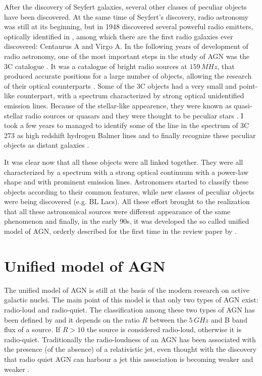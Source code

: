 \documentclass[../main.tex]{subfiles}
\begin{document}
After the discovery of Seyfert galaxies, several other classes of peculiar objects have been discovered. 
At the same time of Seyfert's discovery, radio astronomy was still at its beginning, but in 1948 \citet{Bolton48} discovered several powerful radio emitters, optically identified in \citet{Bolton49}, among which there are the first radio galaxies ever discovered: Centaurus A and Virgo A.
In the following years of development of radio astronomy, one of the most important steps in the study of AGN was the 3C catalogue \citep{Edge59}.
It was a catalogue of bright radio sources at $159\,\si{MHz}$, that produced accurate positions for a large number of objects, allowing the research of their optical counterparts \citep{Shields99}.
Some of the 3C objects had a very small and point-like counterpart, with a spectrum characterized by strong optical unidentified emission lines.
Because of the stellar-like appearence, they were known as quasi-stellar radio sources or quasars and they were thought to be peculiar stars \citep{Shields99}.
I took a few years to managed to identify some of the line in the spectrum of 3C 273 as high redshift hydrogen Balmer lines and to finally recognize these peculiar objects as distant galaxies \citep{Schmidt63}.

It was clear now that all these objects were all linked together.
They were all characterized by a spectrum with a strong optical continuum with a power-law shape and with prominent emission lines.
Astronomers started to classify these objects according to their common features, while new classes of peculiar objects were being discovered (e.g. BL Lacs).
All these effort brought to the realization that all these astronomical sources were different appearance of the same phenomenon and finally, in the early 90s, it was developed the so called unified model of AGN, orderly described for the first time in the review paper by \citet{Antonucci93}.


\section{Unified model of AGN}
\label{sec:unified_model}

The unified model of AGN \citep{Antonucci93} is still at the basis of the modern research on active galactic nuclei.
The main point of this model is that only two types of AGN exist: radio-loud and radio-quiet.
The classification among these two types of AGN has been defined by \citet{Kellermann89} and it depends on the ratio $R$ between the $5\,\si{GHz}$ and B band flux of a source.
If $R>10$ the source is considered radio-loud, otherwise it is radio-quiet.
Traditionally the radio-loudness of an AGN has been associated with the presence (of the absence) of a relativistic jet, even thought with the discovery that radio quiet AGN can harbour a jet \citep[e.g.][]{Blundell03} this association is becoming weaker and weaker \citep{Padovani17,Foschini17}.
\end{document}
